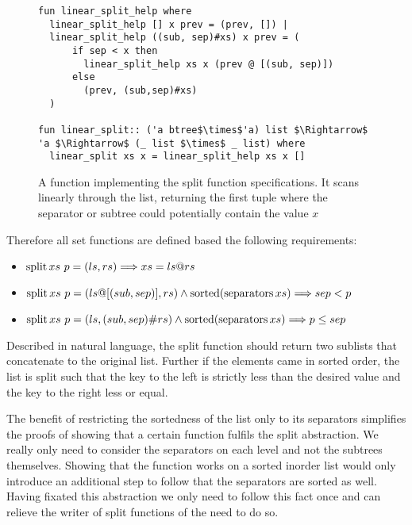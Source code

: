 \begin{figure}
    
\begin{lstlisting}[mathescape=true, language=Isabelle]
fun linear_split_help where
  linear_split_help [] x prev = (prev, []) |
  linear_split_help ((sub, sep)#xs) x prev = (
      if sep < x then
        linear_split_help xs x (prev @ [(sub, sep)])
      else
        (prev, (sub,sep)#xs)
  )

fun linear_split:: ('a btree$\times$'a) list $\Rightarrow$ 'a $\Rightarrow$ (_ list $\times$ _ list) where
  linear_split xs x = linear_split_help xs x []
\end{lstlisting}
\caption{A function implementing the split function specifications.
It scans linearly through the list, returning the first tuple where the separator
or subtree could potentially contain the value $x$}
\label{fig:linear_split}

\end{figure}

Therefore all set functions are defined based the following requirements:

\begin{itemize}
    \item $\operatorname{split} xs\ p = (ls,rs) \Longrightarrow xs = ls @ rs$
    \item $\operatorname{split} xs\ p = (ls@[(sub,sep)],rs) \wedge \operatorname{sorted} (\operatorname{separators} xs) \Longrightarrow sep < p$
    \item $\operatorname{split} xs\ p = (ls,(sub,sep)\#rs) \wedge \operatorname{sorted} (\operatorname{separators} xs) \Longrightarrow p \le sep$
\end{itemize}

Described in natural language, the split function should return two sublists
that concatenate to the original list.
Further if the elements came in sorted order,
the list is split such that the key to the left is strictly less than the desired value
and the key to the right less or equal.

The benefit of restricting the sortedness of the list only to its separators
simplifies the proofs of showing that a certain function fulfils the split abstraction.
We really only need to consider the separators on each level and not the subtrees themselves.
Showing that the function works on a sorted inorder list
would only introduce an additional step to follow that the separators are sorted as well.
Having fixated this abstraction we only need to follow this fact once
and can relieve the writer of split functions of the need to do so.

